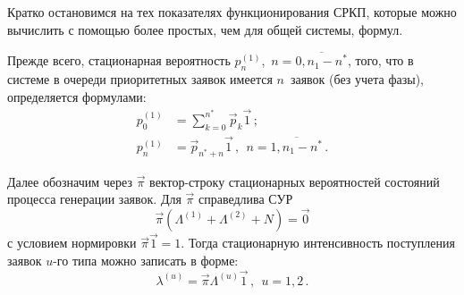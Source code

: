 \begin{multicols}{2}
Кратко остановимся на тех показателях функционирования СРКП,
которые можно вычислить с помощью более простых, чем для
общей системы, формул.

Прежде всего, стационарная вероятность
$p^{(1)}_n$,\ $n=\overline{0,n_1-n^*}$, того, что в системе в
очереди приоритетных заявок имеется $n$~заявок (без учета фазы),
определяется формулами:
\begin{align*}
p^{(1)}_0 &= \sum\limits_{k=0}^{n^*} \vec p_k \vec 1\,;
\\
p^{(1)}_n &= \vec p_{n^*+n} \vec 1\,,
\ \ n=\overline{1,n_1-n^*}\,.
\end{align*}

Далее обозначим через $\vec\pi$ век\-тор-стро\-ку стационарных
вероятностей состояний процесса генерации заявок.
Для $\vec\pi$ справедлива СУР
$$
\vec\pi (\Lambda^{(1)}+\Lambda^{(2)}+N)=\vec {0}
$$
с условием нормировки
$\vec\pi \vec1 =1.$
Тогда стационарную интенсивность поступления заявок $u$-го типа
можно записать в форме:
$$
\lambda^{(u)} = \vec\pi \Lambda^{(u)} \vec1\,,
\ \ u=1,2\,.
$$


\end{multicols}
